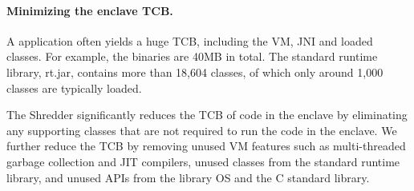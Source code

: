 %




\paragraph{Minimizing the enclave TCB.}
A \java{} application often yields a huge TCB, including the \java{} VM,
JNI and loaded classes.
For example, the \jvm{} binaries are 40MB in total. 
The standard runtime library, {rt.jar}, contains more than 18,604 classes, of which only around 1,000 classes are typically loaded.



The Shredder significantly reduces the TCB of code in the enclave by eliminating any supporting classes
that are not required to run the code in the enclave.
We further reduce the TCB by removing unused \java{} VM features such as multi-threaded garbage collection and JIT compilers, unused classes from the \java{} standard runtime library, and unused APIs from the library OS and the C standard library.

